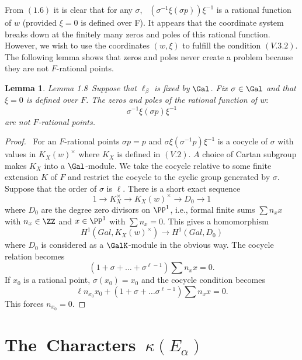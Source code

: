 \documentclass{memo-l}
\newtheorem{lemma}[theorem]{Lemma}
\theoremstyle{definition}
\theoremstyle{remark}
\numberwithin{section}{chapter}
\numberwithin{equation}{chapter}
\begin{document}
{\medskip}

    From $(1.6)$ it is clear that for any ${\sigma}$, \
$({\sigma}^{-1}{\xi}({\sigma}p)){\xi}^{-1}$ is a rational function of $w$
(provided ${\xi} = 0$ is defined over F).  It appears that the coordinate
system breaks down at the finitely many zeros and poles of this rational
function.  However, we wish to use the coordinates $(w,{\xi})$ to fulfill
the condition $(V.3.2)$.  The following lemma shows that zeros and poles
never create a problem because they are not $F$-rational points.

\medskip

\begin{lemma}{Lemma 1.8}\ Suppose that ${\ell}_{{\beta}}$ is fixed by
$\Gal$.  Fix ${\sigma}  \in  \Gal$ and that ${\xi} = 0$ is
defined over $F$.  The zeros and poles of the rational function of $w:$
$$
{\sigma}^{-1}{\xi}({\sigma}p){\xi}^{-1}
$$
are not $F$-rational points.
\end{lemma}

\medpagebreak

\begin{proof} \ For an $F$-rational points ${\sigma}p = p$ and
${\sigma}{\xi}({\sigma}^{-1}p){\xi}^{-1}$ is a cocycle of ${\sigma}$ with
values in $K_X(w)^{\times}$ where $K_X$ is defined in $(V.2)$.  $A$ choice of Cartan
subgroup makes $K_X$ into a $\Gal$-module.  We take the cocycle
relative to some finite extension $K$ of $F$ and restrict the cocycle to
the cyclic group generated by ${\sigma}$.  Suppose that the order of
${\sigma}$ is ${\ell}$.  There is a short exact sequence
$$
1 {\to} K_X^{\times} {\to} K_X(w)^{\times} {\to} D_{0} {\to} 1
$$
where $D_{0}$ are the degree zero divisors on ${\PP}^{1}$,  i.e.,  formal
finite sums $\sum n_{x}x$ with $n_{x} \in {\ZZ}$ and $x \in
{\PP}^{1}$ with $\sum n_{x}  =  0$.  This gives a homomorphism
$$H^{1}(Gal,K_X(w)^{\times}) \to H^{1}(Gal,D_{0})$$ where $D_{0}$ is considered as
a $\GalK$-module in the obvious way.  The cocycle relation becomes
$$
(1+{\sigma}+\ldots +{\sigma}^{{\ell}-1})\sum n_{x}x  =  0 .
$$
If $x_{0}$ is a rational point, ${\sigma}(x_{0})  =  x_{0}$ and the cocycle
condition becomes
$$
{\ell}n_{x_0} x_{0} + (1+{\sigma}+\ldots
{\sigma}^{{\ell}-1})\sum n_{x}x  =  0 .
$$
This forces $n_{x_0}  =  0$.
\end{proof}


\section{The\ Characters\ ${\kappa}(E_\alpha)$}
\end{document}
